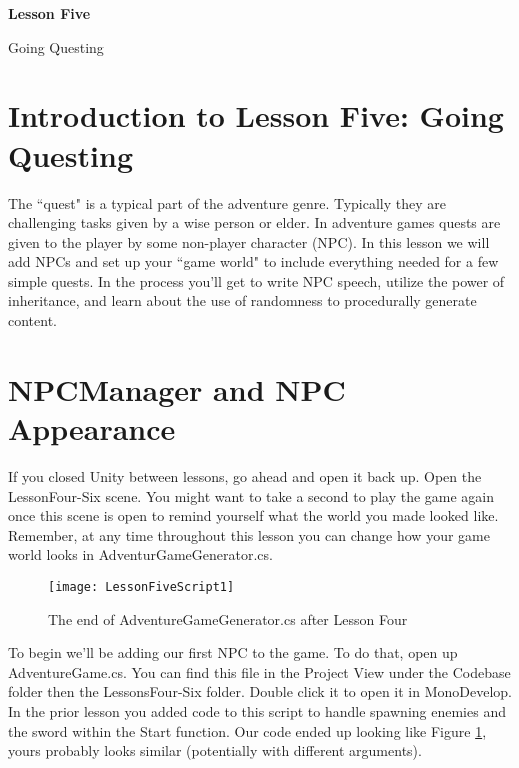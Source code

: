 \documentclass{article}
\begin{document}
\vspace*{\fill}
\begin{center}
{\Huge\bf Lesson Five}

\vspace{2\baselineskip}

{\huge Going Questing}
\end{center}
\vspace*{\fill}
\newpage

\section{Introduction to Lesson Five: Going Questing}

The ``quest" is a typical part of the adventure genre. Typically they are challenging tasks given by a wise person or elder. In adventure games quests are given to the player by some non-player character (NPC). In this lesson we will add NPCs and set up your ``game world" to include everything needed for a few simple quests. In the process you'll get to write NPC speech, utilize the power of inheritance, and learn about the use of randomness to procedurally generate content.

\section{NPCManager and NPC Appearance}

If you closed Unity between lessons, go ahead and open it back up. Open the LessonFour-Six scene. You might want to take a second to play the game again once this scene is open to remind yourself what the world you made looked like. Remember, at any time throughout this lesson you can change how your game world looks in AdventurGameGenerator.cs. 

\begin{figure}
  \texttt{[image: LessonFiveScript1]}
  \caption{The end of AdventureGameGenerator.cs after Lesson Four}
  \label{fig:LessonFiveScript1}
\end{figure}

To begin we'll be adding our first NPC to the game. To do that, open up AdventureGame.cs. You can find this file in the Project View under the Codebase folder then the LessonsFour-Six folder. Double click it to open it in MonoDevelop. In the prior lesson you added code to this script to handle spawning enemies and the sword within the Start function. Our code ended up looking like Figure \ref{fig:LessonFiveScript1}, yours probably looks similar (potentially with different arguments).
\end{document}
